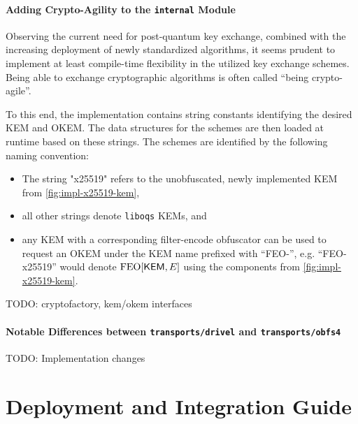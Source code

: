 \paragraph{Adding Crypto-Agility to the \texttt{internal} Module}

Observing the current need for post-quantum key exchange, combined with the increasing deployment of newly standardized algorithms, it seems prudent to implement at least compile-time flexibility in the utilized key exchange schemes. Being able to exchange cryptographic algorithms is often called ``being crypto-agile''.

To this end, the \drivel{} implementation contains string constants identifying the desired KEM and OKEM. The data structures for the schemes are then loaded at runtime based on these strings.
The schemes are identified by the following naming convention:
\begin{itemize}
    \item The string "x25519" refers to the unobfuscated, newly implemented KEM from \cref{fig:impl-x25519-kem},
    \item all other strings denote \texttt{liboqs} KEMs, and
    \item any KEM with a corresponding filter-encode obfuscator can be used to request an OKEM under the KEM name prefixed with ``FEO-'', e.g. ``FEO-x25519'' would denote $\textsf{\textnormal{FEO}}[\mathsf{KEM}, E]$ using the components from \cref{fig:impl-x25519-kem}.
\end{itemize}

TODO: cryptofactory, kem/okem interfaces

\paragraph{Notable Differences between \texttt{transports/drivel} and \texttt{transports/obfs4}}

TODO: Implementation changes

\section{Deployment and Integration Guide} \label{sec:deployment}


